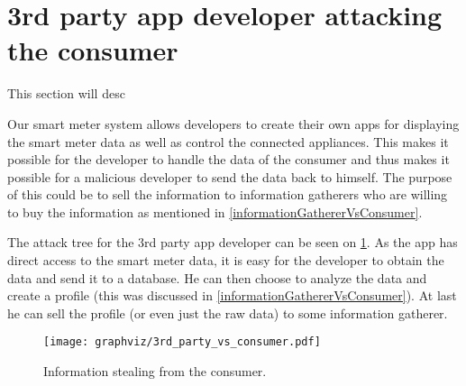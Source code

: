 \section{3rd party app developer attacking the consumer}
This section will desc \stefan{}

Our smart meter system allows developers to create their own apps for displaying the smart meter data as well as control the connected appliances.
This makes it possible for the developer to handle the data of the consumer and thus makes it possible for a malicious developer to send the data back to himself.
The purpose of this could be to sell the information to information gatherers who are willing to buy the information as mentioned in \cref{informationGathererVsConsumer}.

The attack tree for the 3rd party app developer can be seen on \cref{information_stealing_tree}.
As the app has direct access to the smart meter data, it is easy for the developer to obtain the data and send it to a database.
He can then choose to analyze the data and create a profile (this was discussed in \cref{informationGathererVsConsumer}).
At last he can sell the profile (or even just the raw data) to some information gatherer.

\begin{figure}
  \begin{center}
    \texttt{[image: graphviz/3rd\_party\_vs\_consumer.pdf]}
  \end{center}
  \caption{Information stealing from the consumer.}
  \label{information_stealing_tree}
\end{figure}